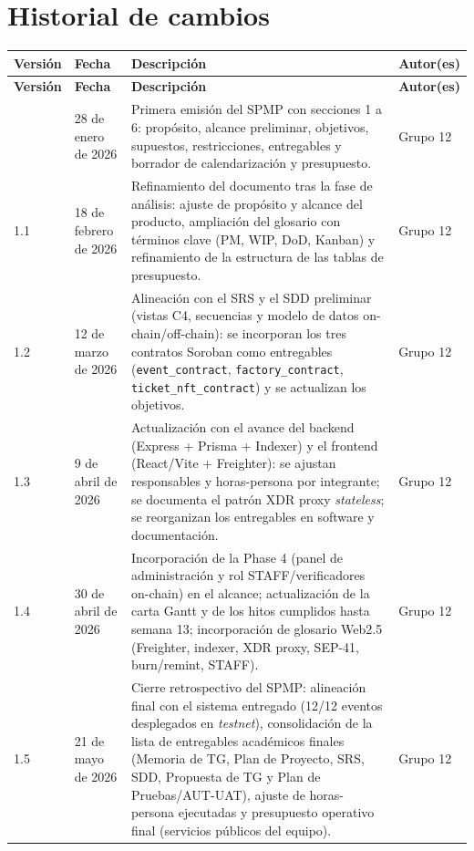 \documentclass[12pt,oneside]{report}
\newcommand{\team}{Grupo 12}
\begin{document}
  \section*{Historial de cambios}
  \begin{longtable}{@{}p{2cm} p{3cm} p{7.5cm} p{2.5cm}@{}}
    \toprule
    \textbf{Versión} & \textbf{Fecha} & \textbf{Descripción} & \textbf{Autor(es)}\\
    \midrule
    \endfirsthead
    \toprule
    \textbf{Versión} & \textbf{Fecha} & \textbf{Descripción} & \textbf{Autor(es)}\\
    \midrule
    \endhead
    \bottomrule
    \endfoot
    1.0 & 28 de enero de 2026 & Primera emisión del SPMP con secciones 1 a 6: propósito, alcance preliminar, objetivos, supuestos, restricciones, entregables y borrador de calendarización y presupuesto. & \team\\
    1.1 & 18 de febrero de 2026 & Refinamiento del documento tras la fase de análisis: ajuste de propósito y alcance del producto, ampliación del glosario con términos clave (PM, WIP, DoD, Kanban) y refinamiento de la estructura de las tablas de presupuesto. & \team\\
    1.2 & 12 de marzo de 2026 & Alineación con el SRS y el SDD preliminar (vistas C4, secuencias y modelo de datos on-chain/off-chain): se incorporan los tres contratos Soroban como entregables (\texttt{event\_contract}, \texttt{factory\_contract}, \texttt{ticket\_nft\_contract}) y se actualizan los objetivos. & \team\\
    1.3 & 9 de abril de 2026 & Actualización con el avance del backend (Express + Prisma + Indexer) y el frontend (React/Vite + Freighter): se ajustan responsables y horas-persona por integrante; se documenta el patrón XDR proxy \textit{stateless}; se reorganizan los entregables en software y documentación. & \team\\
    1.4 & 30 de abril de 2026 & Incorporación de la Phase 4 (panel de administración y rol STAFF/verificadores on-chain) en el alcance; actualización de la carta Gantt y de los hitos cumplidos hasta semana 13; incorporación de glosario Web2.5 (Freighter, indexer, XDR proxy, SEP-41, burn/remint, STAFF). & \team\\
    1.5 & 21 de mayo de 2026 & Cierre retrospectivo del SPMP: alineación final con el sistema entregado (12/12 eventos desplegados en \textit{testnet}), consolidación de la lista de entregables académicos finales (Memoria de TG, Plan de Proyecto, SRS, SDD, Propuesta de TG y Plan de Pruebas/AUT-UAT), ajuste de horas-persona ejecutadas y presupuesto operativo final (servicios públicos del equipo). & \team\\
  \end{longtable}
\end{document}
